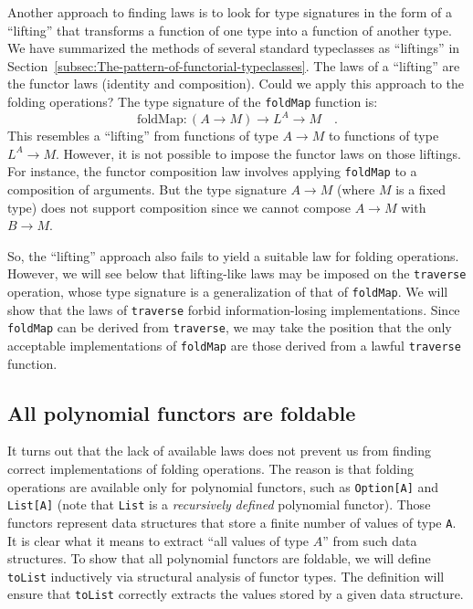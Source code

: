 Another approach to finding laws is to look for type signatures in
the form of a \textsf{``}lifting\textsf{''} that transforms a function of one type
into a function of another type. We have summarized the methods of
several standard typeclasses as \textsf{``}liftings\textsf{''} in Section~\ref{subsec:The-pattern-of-functorial-typeclasses}.
The laws of a \textsf{``}lifting\textsf{''} are the functor laws (identity and composition).
Could we apply this approach to the folding operations? The type signature
of the \lstinline!foldMap! function is:
\[
\text{foldMap}:\left(A\rightarrow M\right)\rightarrow L^{A}\rightarrow M\quad.
\]
This resembles a \textsf{``}lifting\textsf{''} from functions of type $A\rightarrow M$
to functions of type $L^{A}\rightarrow M$. However, it is not possible
to impose the functor laws on those liftings. For instance, the functor
composition law involves applying \lstinline!foldMap! to a composition
of arguments. But the type signature $A\rightarrow M$ (where $M$
is a fixed type) does not support composition since we cannot compose
$A\rightarrow M$ with $B\rightarrow M$.

So, the \textsf{``}lifting\textsf{''} approach also fails to yield a suitable law
for folding operations. However, we will see below that lifting-like
laws may be imposed on the \lstinline!traverse! operation, whose
type signature is a generalization of that of \lstinline!foldMap!.
We will show that the laws of \lstinline!traverse! forbid information-losing
implementations. Since \lstinline!foldMap! can be derived from \lstinline!traverse!,
we may take the position that the only acceptable implementations
of \lstinline!foldMap! are those derived from a lawful \lstinline!traverse!
function.

\subsection{All polynomial functors are foldable}

It turns out that the lack of available laws does not prevent us from
finding correct implementations of folding operations. The reason
is that folding operations are available only for polynomial functors,
such as \lstinline!Option[A]! and \lstinline!List[A]! (note that
\lstinline!List! is a \emph{recursively} \emph{defined} polynomial
functor). Those functors represent
data structures that store a finite number of values of type \lstinline!A!.
It is clear what it means to extract \textsf{``}all values of type $A$\textsf{''}
from such data structures. To show that all polynomial functors are
foldable, we will define \lstinline!toList! inductively via structural
analysis of functor types. The definition will ensure that \lstinline!toList!
correctly extracts the values stored by a given data structure.

